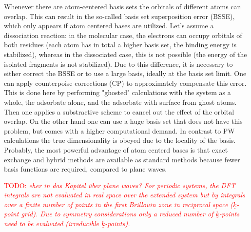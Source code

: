 \documentclass[11pt,DIV=13,BCOR=5mm,a4paper,headinclude]{scrbook}
\newcommand\todo[1]{\textcolor{red}{TODO: \textit{{#1}}}}
\renewcommand{\vec}[1]{\underline{#1}}
\begin{document}
Whenever there are atom-centered basis sets the orbitals of different atoms can overlap.
This can result in the so-called basis set superposition error (BSSE)\cite{BSSE1970}, which only appears if atom centered bases are utilized.
Let's assume a dissociation reaction: in the molecular case, the electrons can occupy orbitals of both residues (each atom has in total a higher basis set, the binding energy is stabilized), whereas in the dissociated case, this is not possible (the energy of the isolated fragments is not stabilized).
Due to this difference, it is necessary to either correct the BSSE or to use a large basis, ideally at the basis set limit.
One can apply counterpoise corrections (CP)\cite{Boys1970} to approximately compensate this error.
This is done here by performing "ghosted" calculations with the system as a whole, the adsorbate alone, and the adsorbate with surface from ghost atoms.
Then one applies a substractive scheme to cancel out the effect of the orbital overlap.
On the other hand one can use a huge basis set that does not have this problem, but comes with a higher computational demand.
In contrast to PW calculations the true dimensionality is obeyed due to the locality of the basis.
Probably, the most powerful advantage of atom centerd bases is that exact exchange and hybrid methods are available as standard methods because fewer basis functions are required, compared to plane waves.

\todo{eher in das Kapitel über plane waves? For periodic systems, the DFT integrals are not evaluated in real space over the extended system but by integrals over a finite number of points in the first Brillouin zone in reciprocal space ($\vec{k}$-point grid).
Due to symmetry considerations only a reduced number of $\vec{k}$-points need to be evaluated (irreducible $\vec{k}$-points).}
\end{document}
